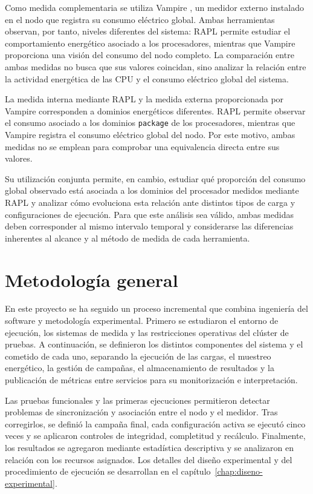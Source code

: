 Como medida complementaria se utiliza Vampire \parencite{diaz2024vampire}, un medidor externo instalado en el nodo que registra su consumo eléctrico global. Ambas herramientas observan, por tanto, niveles diferentes del sistema: RAPL permite estudiar el comportamiento energético asociado a los procesadores, mientras que Vampire proporciona una visión del consumo del nodo completo. La comparación entre ambas medidas no busca que sus valores coincidan, sino analizar la relación entre la actividad energética de las CPU y el consumo eléctrico global del sistema.

La medida interna mediante RAPL y la medida externa proporcionada por
Vampire corresponden a dominios energéticos diferentes. RAPL permite
observar el consumo asociado a los dominios \texttt{package} de los
procesadores, mientras que Vampire registra el consumo eléctrico global
del nodo. Por este motivo, ambas medidas no se emplean para comprobar
una equivalencia directa entre sus valores.

Su utilización conjunta permite, en cambio, estudiar qué proporción del
consumo global observado está asociada a los dominios del procesador
medidos mediante RAPL y analizar cómo evoluciona esta relación ante
distintos tipos de carga y configuraciones de ejecución. Para que este
análisis sea válido, ambas medidas deben corresponder al mismo intervalo
temporal y considerarse las diferencias inherentes al alcance y al método
de medida de cada herramienta.

\section{Metodología general}
\label{sec:introduccion_metodologia}

En este proyecto se ha seguido un proceso incremental que combina ingeniería del software y metodología experimental. Primero se estudiaron el entorno de ejecución, los sistemas de medida y las restricciones operativas del clúster de pruebas. A continuación, se definieron los distintos componentes del sistema y el cometido de cada uno, separando la ejecución de las cargas, el muestreo energético, la gestión de campañas, el almacenamiento de resultados y la publicación de métricas entre servicios para su monitorización e interpretación.

Las pruebas funcionales y las primeras ejecuciones permitieron detectar problemas de sincronización y asociación entre el nodo y el medidor. Tras corregirlos, se definió la campaña final, cada configuración activa se ejecutó cinco veces y se aplicaron controles de integridad, completitud y recálculo. Finalmente, los resultados se agregaron mediante estadística descriptiva y se analizaron en relación con los recursos asignados. Los detalles del diseño experimental y del procedimiento de ejecución se desarrollan en el capítulo~\ref{chap:diseno-experimental}.

